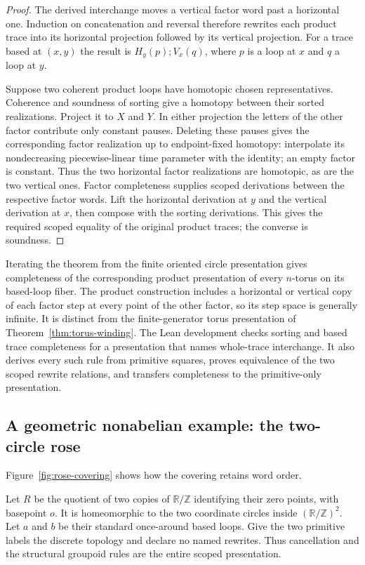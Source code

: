 \documentclass[10pt,reqno]{amsart}
\theoremstyle{definition}
\theoremstyle{plain}
\theoremstyle{remark}
\begin{document}
\begin{proof}
The derived interchange moves a vertical factor word past a horizontal
one. Induction on concatenation and reversal therefore rewrites each
product trace into its horizontal projection followed by its vertical
projection. For a trace based at $(x,y)$ the result is
$H_y(p);V_x(q)$, where $p$ is a loop at $x$ and $q$ a loop at $y$.

Suppose two coherent product loops have homotopic chosen representatives.
Coherence and soundness of sorting give a homotopy between their sorted
realizations. Project it to $X$ and $Y$. In either projection the letters
of the other factor contribute only constant pauses. Deleting these
pauses gives the corresponding factor realization up to endpoint-fixed
homotopy: interpolate its nondecreasing piecewise-linear time parameter
with the identity; an empty factor is constant. Thus the two horizontal
factor realizations are homotopic, as are the two vertical ones.
Factor completeness supplies scoped derivations between the respective
factor words. Lift the horizontal derivation at $y$ and the vertical
derivation at $x$, then compose with the sorting derivations. This gives
the required scoped equality of the original product traces; the converse
is soundness.
\end{proof}

Iterating the theorem from the finite oriented circle presentation gives
completeness of the corresponding product presentation of every
$n$-torus on its based-loop fiber. The product construction includes a
horizontal or vertical copy of each factor step at every point of the other
factor, so its step space is generally infinite. It is distinct from the
finite-generator torus presentation of Theorem~\ref{thm:torus-winding}.
The Lean development checks sorting and based trace completeness for a
presentation that names whole-trace interchange. It also derives every
such rule from primitive squares, proves equivalence of the two scoped
rewrite relations, and transfers completeness to the primitive-only
presentation.

\subsection{A geometric nonabelian example: the two-circle rose}
Figure~\ref{fig:rose-covering} shows how the covering retains word order.

\label{sec:rose}

Let $R$ be the quotient of two copies of $\mathbb R/\mathbb Z$ identifying
their zero points, with basepoint $o$.  It is homeomorphic to the two
coordinate circles inside $(\mathbb R/\mathbb Z)^2$.  Let $a$ and $b$ be
their standard once-around based loops.  Give the two primitive labels the
discrete topology and declare no named rewrites.  Thus cancellation and the
structural groupoid rules are the entire scoped presentation.
\end{document}
